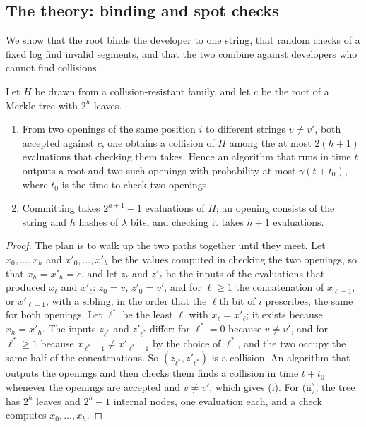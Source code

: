\begin{refsection}
\section{The theory: binding and spot checks}\label{sec:training:binding}

We show that the root binds the developer to one string, that random checks of a fixed log find invalid segments, and that the two combine against developers who cannot find collisions.

\begin{theorem}\label{thm:training:merkle}
Let $H$ be drawn from a collision-resistant family, and let $c$ be the root of a Merkle tree with $2^h$ leaves.
\begin{enumerate}
\item From two openings of the same position $i$ to different strings $v\ne v'$, both accepted against $c$, one obtains a collision of $H$ among the at most $2(h+1)$ evaluations that checking them takes. Hence an algorithm that runs in time $t$ outputs a root and two such openings with probability at most $\gamma(t+t_0)$, where $t_0$ is the time to check two openings.
\item Committing takes $2^{h+1}-1$ evaluations of $H$; an opening consists of the string and $h$ hashes of $\lambda$ bits, and checking it takes $h+1$ evaluations.
\end{enumerate}
\end{theorem}

\begin{proof}
The plan is to walk up the two paths together until they meet. Let $x_0,\dots,x_h$ and $x'_0,\dots,x'_h$ be the values computed in checking the two openings, so that $x_h=x'_h=c$, and let $z_\ell$ and $z'_\ell$ be the inputs of the evaluations that produced $x_\ell$ and $x'_\ell$: $z_0=v$, $z'_0=v'$, and for $\ell\ge1$ the concatenation of $x_{\ell-1}$, or $x'_{\ell-1}$, with a sibling, in the order that the $\ell$th bit of $i$ prescribes, the same for both openings. Let $\ell^*$ be the least $\ell$ with $x_\ell=x'_\ell$; it exists because $x_h=x'_h$. The inputs $z_{\ell^*}$ and $z'_{\ell^*}$ differ: for $\ell^*=0$ because $v\ne v'$, and for $\ell^*\ge1$ because $x_{\ell^*-1}\ne x'_{\ell^*-1}$ by the choice of $\ell^*$, and the two occupy the same half of the concatenations. So $(z_{\ell^*},z'_{\ell^*})$ is a collision. An algorithm that outputs the openings and then checks them finds a collision in time $t+t_0$ whenever the openings are accepted and $v\ne v'$, which gives (i). For (ii), the tree has $2^h$ leaves and $2^h-1$ internal nodes, one evaluation each, and a check computes $x_0,\dots,x_h$.
\end{proof}


\end{refsection}

